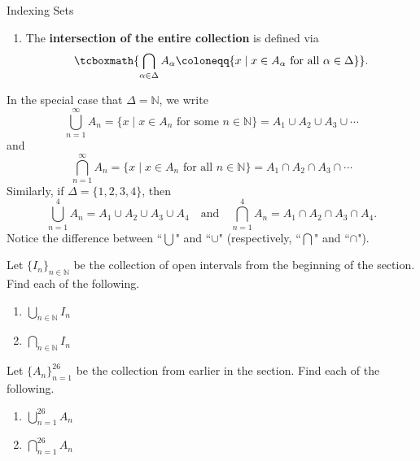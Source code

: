 \begin{section}{Indexing Sets}
\begin{definition}
\begin{enumerate}[label=\textrm{(\alph*)}]
\item The \textbf{intersection of the entire collection} is defined via
\[
\tcboxmath{\bigcap_{\alpha\in\Delta} A_{\alpha}\coloneqq \{x\mid x\in A_{\alpha} \mbox{ for all }\alpha\in \Delta\}}.
\]
\end{enumerate}
\end{definition}

In the special case that $\Delta=\mathbb{N}$, we write
\[
\bigcup_{n=1}^{\infty}A_n= \{ x \mid  x \in A_n \mbox{ for some } n \in \mathbb{N}\}= A_1\cup A_2 \cup A_3 \cup \cdots
\] 
and
\[
\bigcap_{n=1}^{\infty}A_n= \{ x \mid  x \in A_n \mbox{ for all } n \in \mathbb{N}\} = A_1\cap A_2 \cap A_3 \cap \cdots
\] 
Similarly, if $\Delta=\{1,2,3,4\}$, then
\[
\bigcup_{n=1}^{4}A_n= A_1\cup A_2 \cup A_3 \cup A_4 \quad \text{and} \quad
\bigcap_{n=1}^{4}A_n= A_1\cap A_2 \cap A_3 \cap A_4.
\] 
Notice the difference between ``$\bigcup$" and ``$\cup$" (respectively, ``$\bigcap$" and ``$\cap$").  %

\begin{problem}
Let $\{I_n\}_{n\in\mathbb{N}}$ be the collection of open intervals from the beginning of the section.  Find each of the following.
\begin{multicols}{2}
\begin{enumerate}[label=\textrm{(\alph*)}]
\item $\displaystyle \bigcup_{n\in\mathbb{N}}I_n$
\item $\displaystyle \bigcap_{n\in\mathbb{N}}I_n$
\end{enumerate}
\end{multicols}
\end{problem}


\begin{problem}
Let $\{A_n\}_{n=1}^{26}$ be the collection from earlier in the section.  Find each of the following.
\begin{multicols}{2}
\begin{enumerate}[label=\textrm{(\alph*)}]
\item $\displaystyle \bigcup_{n=1}^{26}A_n$
\item $\displaystyle \bigcap_{n=1}^{26}A_n$
\end{enumerate}
\end{multicols}
\end{problem}


\end{section}
